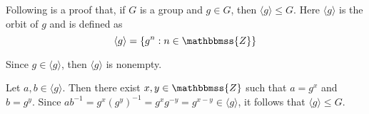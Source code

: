 \documentclass[12pt]{article}
\newcommand{\Z}{\mathbbmss{Z}}
\newcommand{\mathbb}[1]{\mathbbmss{#1}}
\begin{document}
Following is a proof that, if $G$ is a group and $g \in G$, then $\langle g \rangle \le G$. Here $\langle g \rangle$ is the orbit of $g$ and is defined as
$$\langle g \rangle=\{g^n : n\in\Z\}$$

Since $g \in \langle g \rangle$, then $\langle g \rangle$ is nonempty.

Let $a,b \in \langle g \rangle$.  Then there exist $x,y \in {\mathbb Z}$ such that $a=g^x$ and $b=g^y$.  Since $ab^{-1}=g^x(g^y)^{-1}=g^xg^{-y}=g^{x-y} \in \langle g \rangle$, it follows that $\langle g \rangle \le G$.
\end{document}
